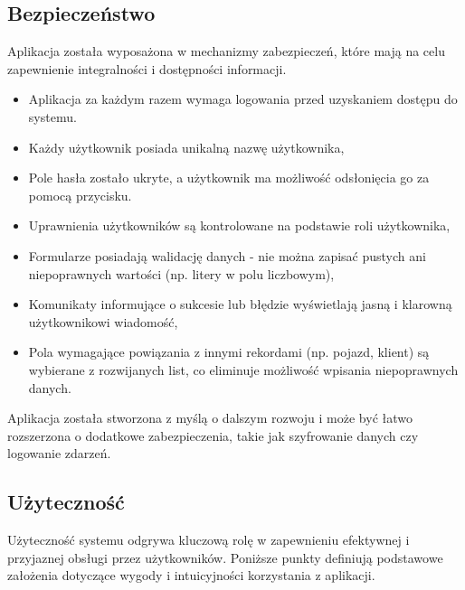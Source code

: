 \subsection{Bezpieczeństwo}
\label{sec:bezpieczenstwo}

Aplikacja została wyposażona w mechanizmy zabezpieczeń, które mają na celu zapewnienie integralności i dostępności informacji.

\begin{itemize}
    \item Aplikacja za każdym razem wymaga logowania przed uzyskaniem dostępu do systemu.
    \item Każdy użytkownik posiada unikalną nazwę użytkownika,
    \item Pole hasła zostało ukryte, a użytkownik ma możliwość odsłonięcia go za pomocą przycisku.
    \item Uprawnienia użytkowników są kontrolowane na podstawie roli użytkownika,
    \item Formularze posiadają walidację danych - nie można zapisać pustych ani niepoprawnych wartości (np. litery w polu liczbowym),
    \item Komunikaty informujące o sukcesie lub błędzie wyświetlają jasną i klarowną użytkownikowi wiadomość,
    \item Pola wymagające powiązania z innymi rekordami (np. pojazd, klient) są wybierane z rozwijanych list, co eliminuje możliwość wpisania niepoprawnych danych.
\end{itemize}

Aplikacja została stworzona z myślą o dalszym rozwoju i może być łatwo rozszerzona o dodatkowe zabezpieczenia, takie jak szyfrowanie danych czy logowanie zdarzeń.

\subsection{Użyteczność}
\label{sec:uzytecznosc}
Użyteczność systemu odgrywa kluczową rolę w zapewnieniu efektywnej i przyjaznej obsługi przez użytkowników. Poniższe punkty definiują podstawowe założenia dotyczące wygody i intuicyjności korzystania z aplikacji.


